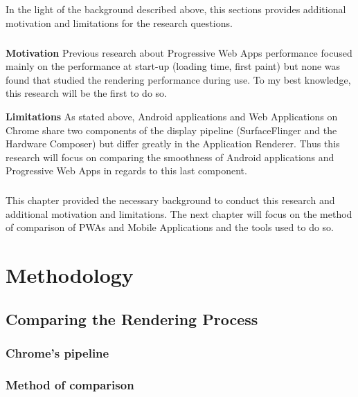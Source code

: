 \documentclass{kththesis}
\begin{document}
In the light of the background described above, this sections provides additional motivation and limitations for the research questions. 
\paragraph{}

\textbf{Motivation} \newline
Previous research about Progressive Web Apps performance focused mainly on the performance at start-up (loading time, first paint) but none was found that studied the rendering performance during use. To my best knowledge, this research will be the first to do so.

\medskip
\textbf{Limitations} \newline
As stated above, Android applications and Web Applications on Chrome share two components of the display pipeline (SurfaceFlinger and the Hardware Composer) but differ greatly in the Application Renderer. Thus this research will focus on comparing the smoothness of Android applications and Progressive Web Apps in regards to this last component. 


\paragraph{}
This chapter provided the necessary background to conduct this research and additional motivation and limitations. The next chapter will focus on the method of comparison of PWAs and Mobile Applications and the tools used to do so.
    

\chapter{Methodology}
\section{Comparing the Rendering Process}
   

    \subsection{Chrome's pipeline}
    \subsection{Method of comparison}
\end{document}
